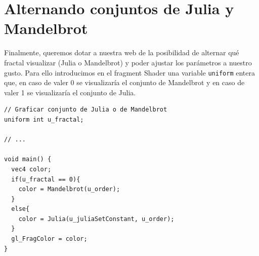 \section{Alternando conjuntos de Julia y Mandelbrot}
\label{section:alternando}

Finalmente, queremos dotar a nuestra web de la posibilidad de alternar qué fractal visualizar (Julia o Mandelbrot) y poder ajustar los parámetros a nuestro gusto. Para ello introducimos en el fragment Shader una variable \verb|uniform| entera que, en caso de valer 0 se visualizaría el conjunto de Mandelbrot y en caso de valer 1 se visualizaría el conjunto de Julia.

\begin{lstlisting}
// Graficar conjunto de Julia o de Mandelbrot
uniform int u_fractal;

// ... 

void main() {
  vec4 color;
  if(u_fractal == 0){
    color = Mandelbrot(u_order);
  }
  else{
    color = Julia(u_juliaSetConstant, u_order);
  }
  gl_FragColor = color;
}
\end{lstlisting}